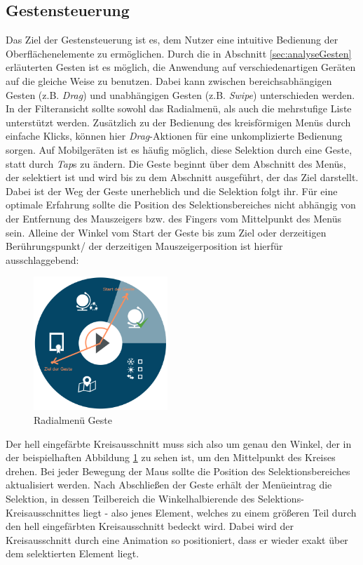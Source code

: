 \subsection{Gestensteuerung}
Das Ziel der Gestensteuerung ist es, dem Nutzer eine intuitive Bedienung der Oberflächenelemente zu ermöglichen. Durch die in Abschnitt \ref{sec:analyseGesten} erläuterten Gesten ist es möglich, die Anwendung auf verschiedenartigen Geräten auf die gleiche Weise zu benutzen. Dabei kann zwischen bereichsabhängigen Gesten (z.B. \textit{Drag}) und unabhängigen Gesten (z.B. \textit{Swipe}) unterschieden werden.
In der Filteransicht sollte sowohl das Radialmenü, als auch die mehrstufige Liste unterstützt werden. Zusätzlich zu der Bedienung des kreisförmigen Menüs durch einfache Klicks, können hier \textit{Drag}-Aktionen für eine unkomplizierte Bedienung sorgen. Auf Mobilgeräten ist es häufig möglich, diese Selektion durch eine Geste, statt durch \textit{Tap}s zu ändern. Die Geste beginnt über dem Abschnitt des Menüs, der selektiert ist und wird bis zu dem Abschnitt ausgeführt, der das Ziel darstellt. Dabei ist der Weg der Geste unerheblich und die Selektion folgt ihr. Für eine optimale Erfahrung sollte die Position des Selektionsbereiches nicht abhängig von der Entfernung des Mauszeigers bzw. des Fingers vom Mittelpunkt des Menüs sein. Alleine der Winkel vom Start der Geste bis zum Ziel oder derzeitigen Berührungspunkt/ der derzeitigen Mauszeigerposition ist hierfür ausschlaggebend:\par
\begin{figure}[H]
 \centering
 \includegraphics[width=0.45\textwidth]{grafiken/radial_gesture.png}
 \caption{Radialmenü Geste}
 \label{fig:radialGesture}
\end{figure}
Der hell eingefärbte Kreisausschnitt muss sich also um genau den Winkel, der in der beispielhaften Abbildung \ref{fig:radialGesture} zu sehen ist, um den Mittelpunkt des Kreises drehen. Bei jeder Bewegung der Maus sollte die Position des Selektionsbereiches aktualisiert werden. Nach Abschließen der Geste erhält der Menüeintrag die Selektion, in dessen Teilbereich die Winkelhalbierende des Selektions-Kreisausschnittes liegt - also jenes Element, welches zu einem größeren Teil durch den hell eingefärbten Kreisausschnitt bedeckt wird. Dabei wird der Kreisausschnitt durch eine Animation so positioniert, dass er wieder exakt über dem selektierten Element liegt. \par
